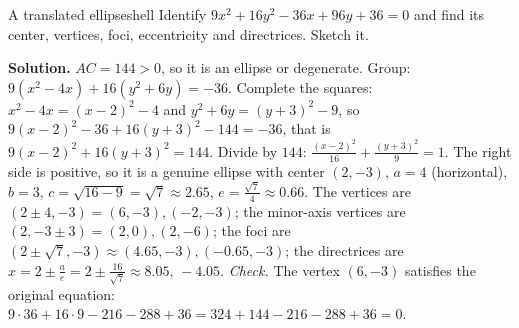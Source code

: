 \documentclass[11pt]{article}
\begin{document}
\begin{exmp}{A translated ellipse}{shell}
Identify $9x^2+16y^2-36x+96y+36=0$ and find its center, vertices, foci, eccentricity and directrices. Sketch it.

\textbf{Solution.} $AC=144>0$, so it is an ellipse or degenerate. Group: $9\left(x^2-4x\right)+16\left(y^2+6y\right)=-36$. Complete the squares: $x^2-4x=(x-2)^2-4$ and $y^2+6y=(y+3)^2-9$, so $9(x-2)^2-36+16(y+3)^2-144=-36$, that is $9(x-2)^2+16(y+3)^2=144$. Divide by $144$: $\frac{(x-2)^2}{16}+\frac{(y+3)^2}9=1$. The right side is positive, so it is a genuine ellipse with center $(2,-3)$, $a=4$ (horizontal), $b=3$, $c=\sqrt{16-9}=\sqrt7\approx2.65$, $e=\frac{\sqrt7}4\approx0.66$. The vertices are $(2\pm4,-3)=(6,-3),(-2,-3)$; the minor-axis vertices are $(2,-3\pm3)=(2,0),(2,-6)$; the foci are $\left(2\pm\sqrt7,-3\right)\approx(4.65,-3),(-0.65,-3)$; the directrices are $x=2\pm\frac ae=2\pm\frac{16}{\sqrt7}\approx8.05,\,-4.05$.
\emph{Check.} The vertex $(6,-3)$ satisfies the original equation: $9\cdot36+16\cdot9-216-288+36=324+144-216-288+36=0$.


\end{exmp}
\end{document}
